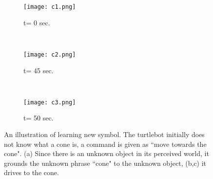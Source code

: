 

\begin{figure}
\begin{subfigure}[b]{0.305\columnwidth}
\centering
\texttt{[image: c1.png]}
\caption{t= 0 sec.}
\label{fig:g_acc}
\end{subfigure}
~
\begin{subfigure}[b]{0.31\columnwidth}
\centering
\texttt{[image: c2.png]}
\caption{t= 45 sec.}
\label{fig:symbols}
\end{subfigure}
~
\begin{subfigure}[b]{0.315\columnwidth}
\centering
\texttt{[image: c3.png]}
\caption{t= 50 sec.}
\label{fig:g_acc_split}
\end{subfigure}
\caption{An illustration of learning new symbol. The turtlebot initially does not know what a cone is, a command is given as ``move towards the cone". (a) Since there is an unknown object in its perceived world, it grounds the unknown phrase ``cone" to the unknown object, (b,c) it drives to the cone.}
\label{fig:cone}
\end{figure}

